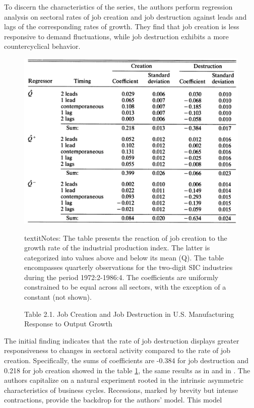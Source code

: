 \documentclass[12pt]{report}
\begin{document}
To discern the characteristics of the series, the authors perform regression analysis on sectoral rates of job creation
and job destruction against leads and lags of the corresponding rates of growth. They find that job creation is less
responsive to demand fluctuations, while job destruction exhibits a more countercyclical behavior. 
\begin{figure}
    \centering
    \includegraphics[scale = 0.4]{figure/Plot2.3.png}
    \caption{Table 2.1. Job Creation and Job Destruction in U.S. Manufacturing Response to Output Growth}
    \label{Table 2.1.}
    \footnotesize textit{Notes}: The table presents the reaction of job creation to the growth rate of the industrial
    production index. The latter is categorized into values above and below its mean (Q). The table encompasses
    quarterly observations for the two-digit SIC industries during the period 1972:2-1986:4. The coefficients are
    uniformly constrained to be equal across all sectors, with the exception of a constant (not shown).  
\end{figure}
The initial finding indicates that the rate of job destruction displays greater responsiveness to changes in sectoral
activity compared to the rate of job creation. Specifically, the sums of coefficients are -0.384 for job destruction and
0.218 for job creation showed in the table \ref{Table 2.1.}, the same results as in \cite{DAvHalt90,DavHalt92} and in
\cite{BlaDia90}.
The authors capitalize on a natural experiment rooted in the intrinsic asymmetric characteristics of business cycles.
Recessions, marked by brevity but intense contractions, provide the backdrop for the authors' model. This model
\end{document}
